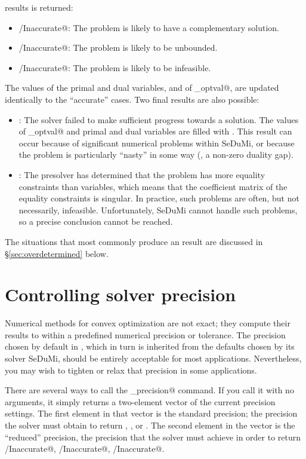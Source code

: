 \documentclass[12pt]{article}
\begin{document}
results is returned:
\begin{itemize}
	\item \verb@Solved/Inaccurate@: The problem is likely to have a complementary solution.
	\item \verb@Unbounded/Inaccurate@: The problem is likely to be unbounded.
	\item \verb@Infeasible/Inaccurate@: The problem is likely to be infeasible.
\end{itemize}
The values of the primal and dual variables, and of \verb@cvx_optval@, are updated
identically to the ``accurate'' cases. Two final results are also possible:
\begin{itemize}
	\item \verb@Failed@: The solver failed to make sufficient progress towards
	      a solution. The values of \verb@cvx_optval@ and primal and dual
	      variables are filled with \verb@NaN@s. This result can occur because
	      of significant numerical problems within SeDuMi, or because the problem
	      is particularly ``nasty'' in some way (\eg, a non-zero duality gap).
	\item \verb@Overdetermined@: The presolver has determined that the problem
	      has more equality constraints than variables, which means that the coefficient
	      matrix of the equality constraints is singular. In practice, such problems are
	      often, but not necessarily, infeasible. Unfortunately, SeDuMi 
	      cannot handle such problems, so a precise conclusion
	      cannot be reached.
\end{itemize}
The situations that most commonly produce an \verb@Overdetermined@ result are discussed
in \S\ref{sec:overdetermined} below.

\section{Controlling solver precision}
\label{sec:precision}

Numerical methods for convex optimization are not exact; they compute their results
to within a predefined numerical precision or tolerance. The precision chosen by default in \cvx,
which in turn is inherited from the defaults chosen by its solver SeDuMi, should
be entirely acceptable for most applications. Nevertheless, you may wish to tighten
or relax that precision in some applications.

There are several ways to call the \verb@cvx_precision@ command. If you call it with no arguments,
it simply returns a two-element vector of the current precision settings. The first element
in that vector is the standard precision; the precision the solver must obtain to return
\verb@Solved@, \verb@Unbounded@, or \verb@Infeasible@. The second element in the vector is
the ``reduced'' precision, the precision that the solver must achieve in order to
return \verb@Solved/Inaccurate@, \verb@Unbounded/Inaccurate@, \verb@Infeasible/Inaccurate@.
\end{document}
